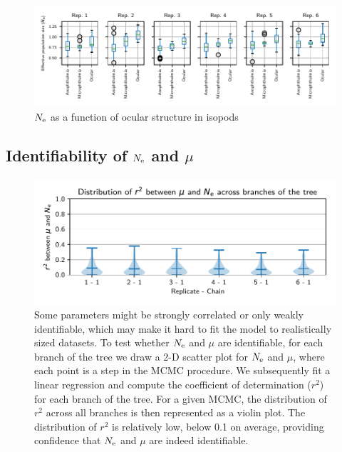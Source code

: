 \documentclass{article}
\begin{document}
	\begin{figure}[H]
		\centering
		\includegraphics[width=\linewidth, page=1]{isopods/12CDS_SiteMutSelBranchNe_Rep_LogPopulationSize_eye}
		\caption[$\Ne$ as a function of ocular structure in isopods]{$\Ne$ as a function of ocular structure in isopods}
	\end{figure}
	

	\subsection{Identifiability of $\Ne$ and $\mu$}
	\label{subsec:isopods-identifiability}

	\begin{figure}[H]
		\centering
		\includegraphics[width=\linewidth, page=1]{isopods/identifiability}
		\caption[Identifiability of $\Ne$ and $\mu$]{
			Some parameters might be strongly correlated or only weakly identifiable, which may make it hard to fit the model to realistically sized datasets.
			To test whether $\Ne$ and $\mu$ are identifiable, for each branch of the tree we draw a 2-D scatter plot for $\Ne$ and $\mu$, where each point is a step in the MCMC procedure.
			We subsequently fit a linear regression and compute the coefficient of determination ($r^2$) for each branch of the tree.
			For a given MCMC, the distribution of $r^2$ across all branches is then represented as a violin plot.
			The distribution of $r^2$ is relatively low, below 0.1 on average, providing confidence that $\Ne$ and $\mu$ are indeed identifiable.}
	\end{figure}
\end{document}
